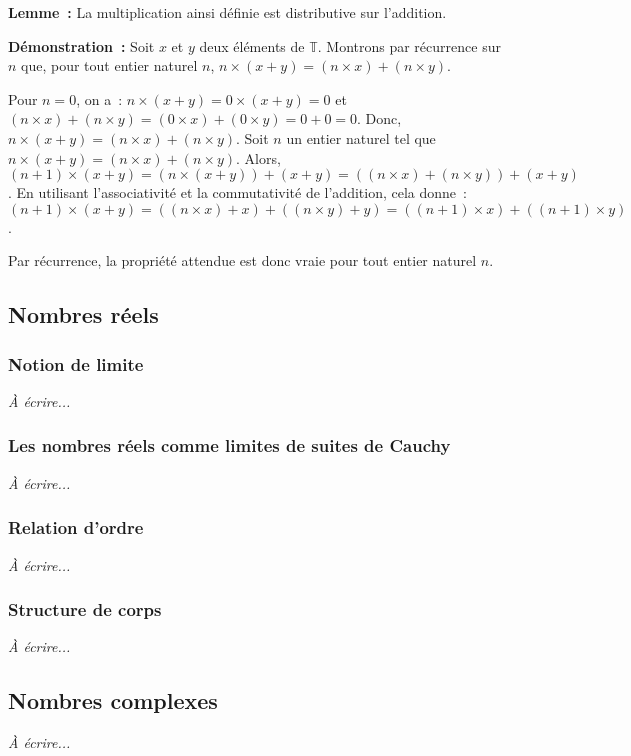 \medskip

\noindent\textbf{Lemme :} La multiplication ainsi définie est distributive sur l'addition.

\medskip

\noindent\textbf{Démonstration :} Soit $x$ et $y$ deux éléments de $\mathbb{T}$.
    Montrons par récurrence sur $n$ que, pour tout entier naturel $n$, $n \times (x + y) = (n \times x) + (n \times y)$.
    
    Pour $n = 0$, on a : $n \times (x + y) = 0 \times (x + y) = 0$ et $(n \times x) + (n \times y) = (0 \times x) + (0 \times y) = 0 + 0 = 0$.
    Donc, $n \times (x + y) = (n \times x) + (n \times y)$. 
    Soit $n$ un entier naturel tel que $n \times (x + y) = (n \times x) + (n \times y)$.
    Alors, $(n + 1) \times (x + y) = (n \times (x + y)) + (x + y) = ((n \times x) + (n \times y)) + (x + y)$. 
    En utilisant l'associativité et la commutativité de l'addition, cela donne : $(n + 1) \times (x + y) = ((n \times x) + x) + ((n \times y) + y) = ((n + 1) \times x) + ((n + 1) \times y)$. 

    Par récurrence, la propriété attendue est donc vraie pour tout entier naturel $n$.

    \done

\subsection{Nombres réels}

\subsubsection{Notion de limite}

\emph{À écrire...}

\subsubsection{Les nombres réels comme limites de suites de Cauchy}

\emph{À écrire...}

\subsubsection{Relation d'ordre}

\emph{À écrire...}

\subsubsection{Structure de corps}

\emph{À écrire...}

\subsection{Nombres complexes}

\emph{À écrire...}
